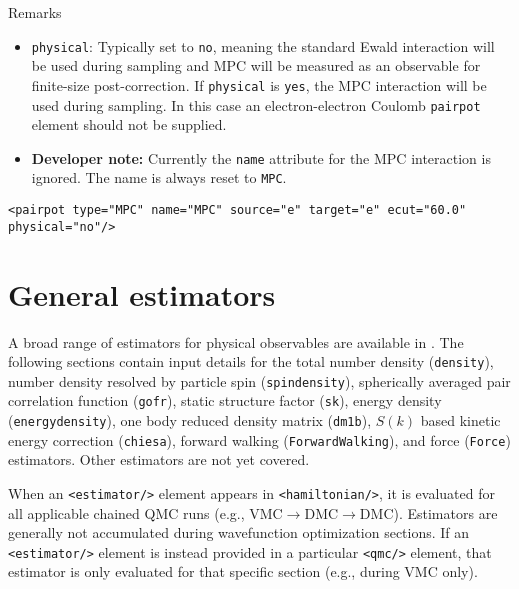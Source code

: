 \FloatBarrier
Remarks
\begin{itemize}
  \item{\texttt{physical}:  Typically set to \texttt{no}, meaning the standard Ewald interaction will be used during sampling and MPC will be measured as an observable for finite-size post-correction.  If \texttt{physical} is \texttt{yes}, the MPC interaction will be used during sampling.  In this case an electron-electron Coulomb \texttt{pairpot} element should not be supplied.}
  \item{\textbf{Developer note:} Currently the \texttt{name} attribute for the MPC interaction is ignored.  The name is always reset to \texttt{MPC}.}
\end{itemize}

\begin{lstlisting}[style=QMCPXML,caption=MPC for finite-size postcorrection.]
  <pairpot type="MPC" name="MPC" source="e" target="e" ecut="60.0" physical="no"/>
\end{lstlisting}



\section{General estimators}

A broad range of estimators for physical observables are available in \qmcpack.  The following sections contain input details for the total number density (\texttt{density}), number density resolved by particle spin (\texttt{spindensity}), spherically averaged pair correlation function (\texttt{gofr}), static structure factor (\texttt{sk}), energy density (\texttt{energydensity}), one body reduced density matrix (\texttt{dm1b}), $S(k)$ based kinetic energy correction (\texttt{chiesa}), forward walking (\texttt{ForwardWalking}), and force (\texttt{Force}) estimators.  Other estimators are not yet covered.

When an \texttt{<estimator/>} element appears in \texttt{<hamiltonian/>}, it is evaluated for all applicable chained QMC runs ({e.g.,} VMC$\rightarrow$DMC$\rightarrow$DMC).  Estimators are generally not accumulated during wavefunction optimization sections.    If an \texttt{<estimator/>} element is instead provided in a particular \texttt{<qmc/>} element, that estimator is only evaluated for that specific section ({e.g.,} during VMC only).


